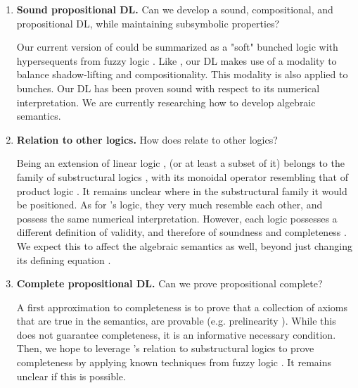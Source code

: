 \begin{enumerate}
    \item \textbf{Sound propositional DL.} Can we develop a sound, compositional, and propositional DL, while maintaining subsymbolic properties? 
    
    Our current version of \OL{} could be summarized as a "soft" bunched logic \citep{o1999logic} with hypersequents from fuzzy logic \citep{prooffuzzy}. Like \citeauthor{capucci2024quantifiers}, our DL makes use of a modality to balance shadow-lifting and compositionality. This modality is also applied to bunches. Our DL has been proven sound with respect to its numerical interpretation. We are currently researching how to develop algebraic semantics.


    \item \textbf{Relation to other logics.} How does \OL{} relate to other logics? 
    
    Being an extension of linear logic \citep{Wadler1993, agliano2025algebraic}, \OL{} (or at least a subset of it) belongs to the family of substructural logics \citep{galatos2007residuated}, with its monoidal operator resembling that of product logic \citep{cintula2011handbook, prooffuzzy}. It remains unclear where in the substructural family it would be positioned. As for \citeauthor{capucci2024quantifiers}'s logic, they very much resemble each other, and possess the same numerical interpretation. However, each logic possesses a different definition of validity, and therefore of soundness and completeness \citep{galatos2007residuated, capucci2024quantifiers}. We expect this to affect the algebraic semantics as well, beyond just changing its defining equation \citep{galatos2007residuated, agliano2025algebraic}. 
    
    \item \textbf{Complete propositional DL.} Can we prove propositional \OL{} complete?
    
    A first approximation to completeness is to prove that a collection of axioms that are true in the semantics, are provable (e.g. prelinearity \citep{prooffuzzy}). While this does not guarantee completeness, it is an informative necessary condition. Then, we hope to leverage \OL{}'s relation to substructural logics to prove completeness by applying known techniques from fuzzy logic \citep{cintula2011handbook, galatos2007residuated}. It remains unclear if this is possible. 
    

\end{enumerate}

